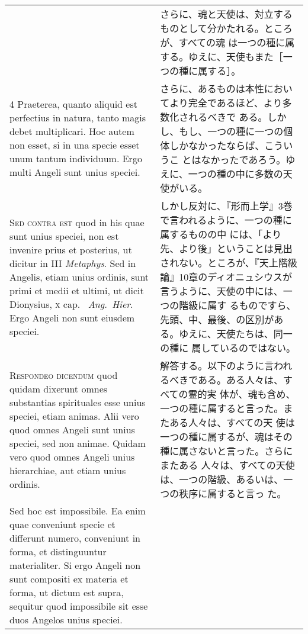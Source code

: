 \documentclass[10pt]{jsarticle} %
\begin{document}
\begin{longtable}{p{21em}p{21em}}
&

さらに、魂と天使は、対立するものとして分かたれる。ところが、すべての魂
 は一つの種に属する。ゆえに、天使もまた［一つの種に属する］。

\\


4 Praeterea, quanto aliquid est perfectius in
natura, tanto magis debet multiplicari. Hoc autem non esset, si in una
specie esset unum tantum individuum. Ergo multi Angeli sunt unius
speciei.


&


さらに、あるものは本性においてより完全であるほど、より多数化されるべきで
 ある。しかし、もし、一つの種に一つの個体しかなかったならば、こういうこ
 とはなかったであろう。ゆえに、一つの種の中に多数の天使がいる。

 \\

 {\scshape Sed contra est} quod in his quae sunt unius speciei, non
est invenire prius et posterius, ut dicitur in III {\itshape
Metaphys}. Sed in Angelis, etiam unius ordinis, sunt primi et medii et
ultimi, ut dicit Dionysius, {\scshape x} cap.~{\itshape
Ang.~Hier}. Ergo Angeli non sunt eiusdem speciei.


&

 しかし反対に、『形而上学』3巻で言われるように、一つの種に属するものの中
 には、「より先、より後」ということは見出されない。ところが、『天上階級
 論』10章のディオニュシウスが言うように、天使の中には、一つの階級に属す
 るものですら、先頭、中、最後、の区別がある。ゆえに、天使たちは、同一の種に
 属しているのではない。


\\



 {\scshape Respondeo dicendum} quod quidam dixerunt omnes substantias
 spirituales esse unius speciei, etiam animas. Alii vero quod omnes
 Angeli sunt unius speciei, sed non animae. Quidam vero quod omnes
 Angeli unius hierarchiae, aut etiam unius ordinis.



&

 解答する。以下のように言われるべきである。ある人々は、すべての霊的実
 体が、魂も含め、一つの種に属すると言った。またある人々は、すべての天
 使は一つの種に属するが、魂はその種に属さないと言った。さらにまたある
 人々は、すべての天使は、一つの階級、あるいは、一つの秩序に属すると言っ
 た。


\\

Sed hoc est
impossibile. 
Ea enim quae conveniunt specie et differunt numero,
conveniunt in forma, et distinguuntur materialiter. Si ergo Angeli non
sunt compositi ex materia et forma, ut dictum est supra, sequitur quod
impossibile sit esse duos Angelos unius speciei. 



\end{longtable}
\end{document}

